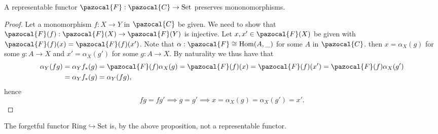 \begin{proposition}
    A representable functor $\pazocal{F} : \pazocal{C}\rightarrow \mathrm{Set}$ preserves mononomorphisms. 
\end{proposition}
\begin{proof}
    Let a monomorphism $f : X\rightarrow Y$ in $\pazocal{C}$ be given. We need to show that $\pazocal{F}(f) : \pazocal{F}(X)\rightarrow \pazocal{F}(Y)$ is injective. Let $x,x'\in \pazocal{F}(X)$ be given with $\pazocal{F}(f)(x)=\pazocal{F}(f)(x')$. Note that $\alpha:\pazocal{F}\cong \Hom(A,\_)$ for some $A$ in $\pazocal{C}$. then $x= \alpha_X(g)$ for some $g:A\rightarrow X$ and $x' = \alpha_X(g')$ for some $g: A\rightarrow X$. By naturality we thus have that 
    \begin{align*}
        \alpha_Y(fg) &=\alpha_Y f_\ast(g) = \pazocal{F}(f)\alpha_X(g) = \pazocal{F}(f)(x)=\pazocal{F}(f)(x') = \pazocal{F}(f)\alpha_X(g')\\ 
        &= \alpha_Yf_\ast(g) = \alpha_Y(fg),
    \end{align*}
    hence 
    $$
        fg = fg' \implies g=g' \implies x=\alpha_X(g)=\alpha_X(g') = x'.
    $$
\end{proof}
\begin{example}
    The forgetful functor $\mathrm{Ring}\hookrightarrow \mathrm{Set}$ is, by the above proposition, not a representable functor.  
\end{example}

